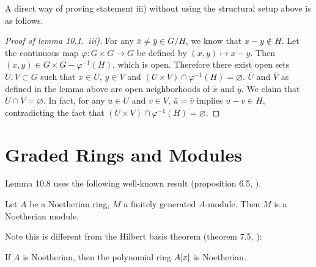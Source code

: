 \documentclass{note}
\begin{document}
A direct way of proving statement iii) without using the structural setup above
is as follows.

\begin{proof}[Proof of lemma 10.1.~iii)] For any
  $\bar{x} \neq \bar{y} \in G/H$, we know that $x - y \notin H$. Let
  the continuous map $\varphi\colon G\times G \to G$ be defined by $(x,y) \mapsto
    x - y$. Then $(x,y) \in G\times G - \varphi^{-1}(H)$, which is open. Therefore
  there exist open sets $U,V \subset G$ such that $x\in U$, $y\in V$ and
  $(U\times V) \cap \varphi^{-1}(H) = \varnothing$. $\overline{U}$ and
  $\overline{V}$ as defined in the lemma above are open neighborhoods of
  $\bar{x}$ and $\bar{y}$. We claim that $\overline{U} \cap \overline{V} =
    \varnothing$. In fact, for any $u\in U$ and $v\in V$, $\bar{u} = \bar{v}$
  implies $u - v \in H$, contradicting the fact that $(U\times V) \cap
    \varphi^{-1}(H) = \varnothing$.
\end{proof}

\section*{Graded Rings and Modules}



Lemma 10.8 uses the following well-known result (proposition 6.5, ).
\begin{proposition*}
  Let $A$ be a Noetherian ring, $M$ a finitely generated $A$-module. Then $M$ is
  a Noetherian module.
\end{proposition*}
Note this is different from the Hilbert basis theorem (theorem 7.5, ):
\begin{theorem*}
  If $A$ is Noetherian, then the polynomial ring $\polynomials{A}{x}$ is
  Noetherian.
\end{theorem*}
\end{document}
